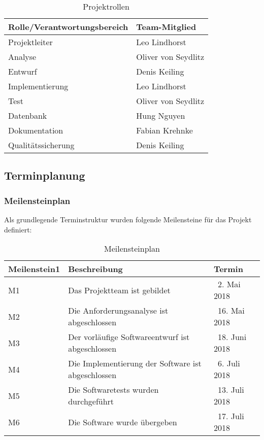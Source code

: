 \documentclass{scrartcl}
\begin{document}
\begin{table}[h]
	\begin{tabular}{l|l}
	Rolle/Verantwortungsbereich & Team-Mitglied \\
	\hline
	Projektleiter & Leo Lindhorst \\
	\hline
	Analyse & Oliver von Seydlitz \\
	\hline
	Entwurf & Denis Keiling \\
	\hline
	Implementierung & Leo Lindhorst \\
	\hline
	Test & Oliver von Seydlitz \\
	\hline
	Datenbank & Hung Nguyen \\
	\hline
	Dokumentation & Fabian Krehnke \\
	\hline
	Qualitätssicherung & Denis Keiling \\
	\hline
	\end{tabular}
	\caption{Projektrollen}
	\label{tab:Projektrollen}
\end{table}

\subsection{Terminplanung}
\subsubsection{Meilensteinplan}
Als grundlegende Terminstruktur wurden folgende Meilensteine für das Projekt definiert:

\begin{table}[h]
	\begin{tabular}{l|l|l}
	Meilenstein1 & Beschreibung & Termin \\
	\hline
	M1 & Das Projektteam ist gebildet & 2. Mai 2018 \\
	\hline
	M2 & Die Anforderungsanalyse ist abgeschlossen & 16. Mai 2018 \\
	\hline
	M3 & Der vorläufige Softwareentwurf ist abgeschlossen & 18. Juni 2018 \\
	\hline
	M4 & Die Implementierung der Software ist abgeschlossen & 6. Juli 2018 \\
	\hline
	M5 & Die Softwaretests wurden durchgeführt & 13. Juli 2018 \\
	\hline
	M6 & Die Software wurde übergeben & 17. Juli 2018 \\
	\hline
	\end{tabular}
	\caption{Meilensteinplan}
	\label{tab:Meilensteinplan}
\end{table}
\end{document}
